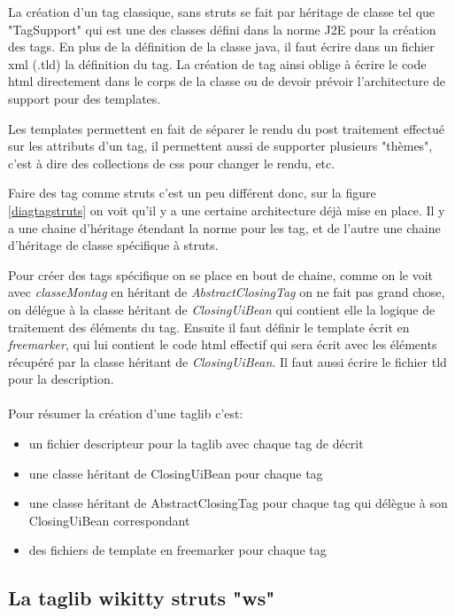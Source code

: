 La création d'un tag classique, sans struts se fait par héritage de classe 
tel que "TagSupport" qui est une des classes défini dans la norme J2E pour la 
création des tags. En plus de la définition de la classe java, il faut écrire
dans un fichier xml (.tld) la définition du tag. La création de tag ainsi oblige
à écrire le code html directement dans le corps de la classe ou de devoir prévoir
l'architecture de support pour des templates.

Les templates permettent en fait de séparer le rendu du post traitement effectué
sur les attributs d'un tag, il permettent aussi de supporter plusieurs "thèmes", 
c'est à dire des collections de css pour changer le rendu, etc.

Faire des tag comme struts c'est un peu différent donc, sur la figure \ref{diagtagstruts} 
on voit qu'il y a une certaine architecture déjà mise en place. Il y a une chaine 
d'héritage étendant la norme pour les tag, et de l'autre une chaine d'héritage 
de classe spécifique à struts. 

Pour créer des tags spécifique on se place en bout de chaine, comme on le voit 
avec \emph{classeMontag} en héritant de \emph{AbstractClosingTag} on ne fait pas
grand chose, on délégue à la classe héritant de \emph{ClosingUiBean} qui contient 
elle la logique de traitement des éléments du tag. Ensuite il faut définir le
template écrit en \emph{freemarker}, qui lui contient le code html effectif 
qui sera écrit avec les éléments récupéré par la classe héritant de \emph{ClosingUiBean}.
Il faut aussi écrire le fichier tld pour la description.\\
\\
Pour résumer la création d'une taglib c'est:

\begin{itemize}
\item un fichier descripteur pour la taglib avec chaque tag de décrit 
\item une classe héritant de ClosingUiBean pour chaque tag
\item une classe héritant de AbstractClosingTag pour chaque tag qui délègue à son ClosingUiBean correspondant
\item des fichiers de template en freemarker pour chaque tag
\end{itemize}



\subsection{La taglib wikitty struts "ws"}

